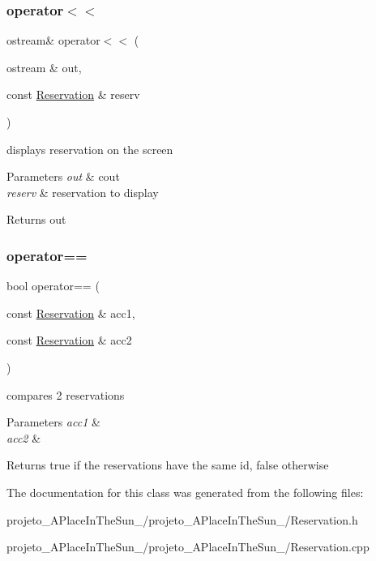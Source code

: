 \subsubsection{\texorpdfstring{operator$<$$<$}{operator<<}}
{\footnotesize\ttfamily ostream\& operator$<$$<$ (\begin{DoxyParamCaption}\item[{ostream \&}]{out,  }\item[{const \hyperlink{class_reservation}{Reservation} \&}]{reserv }\end{DoxyParamCaption})\hspace{0.3cm}{\ttfamily [friend]}}



displays reservation on the screen 


\begin{DoxyParams}{Parameters}
{\em out} & cout\\
\hline
{\em reserv} & reservation to display\\
\hline
\end{DoxyParams}
\begin{DoxyReturn}{Returns}
out 
\end{DoxyReturn}
\hypertarget{class_reservation_aedba0fd671214e780c8933b23585b0c9}{}\label{class_reservation_aedba0fd671214e780c8933b23585b0c9} 
\subsubsection{\texorpdfstring{operator==}{operator==}}
{\footnotesize\ttfamily bool operator== (\begin{DoxyParamCaption}\item[{const \hyperlink{class_reservation}{Reservation} \&}]{acc1,  }\item[{const \hyperlink{class_reservation}{Reservation} \&}]{acc2 }\end{DoxyParamCaption})\hspace{0.3cm}{\ttfamily [friend]}}



compares 2 reservations 


\begin{DoxyParams}{Parameters}
{\em acc1} & \\
\hline
{\em acc2} & \\
\hline
\end{DoxyParams}
\begin{DoxyReturn}{Returns}
true if the reservations have the same id, false otherwise 
\end{DoxyReturn}


The documentation for this class was generated from the following files\+:\begin{DoxyCompactItemize}
\item 
projeto\+\_\+\+A\+Place\+In\+The\+Sun\+\_/projeto\+\_\+\+A\+Place\+In\+The\+Sun\+\_/Reservation.\+h\item 
projeto\+\_\+\+A\+Place\+In\+The\+Sun\+\_/projeto\+\_\+\+A\+Place\+In\+The\+Sun\+\_/Reservation.\+cpp\end{DoxyCompactItemize}
